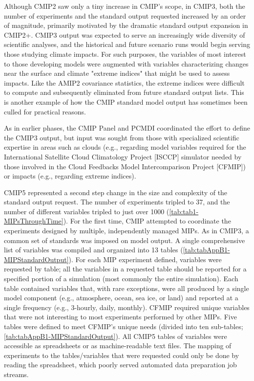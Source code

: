 \documentclass[gmd, preprint]{copernicus}
\begin{document}
Although CMIP2 saw only a tiny increase in CMIP's scope, in CMIP3, both the number of experiments and the standard output requested increased by an order of magnitude, primarily motivated by the dramatic standard output expansion in CMIP2+. CMIP3 output was expected to serve an increasingly wide diversity of scientific analyses, and the historical and future scenario runs would begin serving those studying climate impacts. For such purposes, the variables of most interest to those developing models were augmented with variables characterizing changes near the surface and climate "extreme indices" that might be used to assess impacts. Like the AMIP2 covariance statistics, the extreme indices were difficult to compute and subsequently eliminated from future standard output lists. This is another example of how the CMIP standard model output has sometimes been culled for practical reasons.

As in earlier phases, the CMIP Panel and PCMDI coordinated the effort to define the CMIP3 output, but input was sought from those with specialized scientific expertise in areas such as clouds (e.g., regarding model variables required for the International Satellite Cloud Climatology Project [ISCCP] simulator needed by those involved in the Cloud Feedbacks Model Intercomparison Project [CFMIP]) or impacts (e.g., regarding extreme indices).

CMIP5 represented a second step change in the size and complexity of the standard output request. The number of experiments tripled to 37, and the number of different variables tripled to just over 1000 (\autoref{tab:tab1-MIPsThroughTime}). For the first time, CMIP attempted to coordinate the experiments designed by multiple, independently managed MIPs. As in CMIP3, a common set of standards was imposed on model output.  A single comprehensive list of variables was compiled and organized into 13 tables (\autoref{tab:tabAppB1-MIPStandardOutput}). For each MIP experiment defined, variables were requested by table; all the variables in a requested table should be reported for a specified portion of a simulation (most commonly the entire simulation). Each table contained variables that, with rare exceptions, were all produced by a single model component (e.g., atmosphere, ocean, sea ice, or land) and reported at a single frequency (e.g., 3-hourly, daily, monthly). CFMIP required unique variables that were not interesting to most experiments performed by other MIPs. Five tables were defined to meet CFMIP's unique needs (divided into ten sub-tables; \autoref{tab:tabAppB1-MIPStandardOutput}). All CMIP5 tables of variables were accessible as spreadsheets or as machine-readable text files. The mapping of experiments to the tables/variables that were requested could only be done by reading the spreadsheet, which poorly served automated data preparation job streams.
\end{document}
